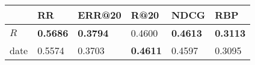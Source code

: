 \begin{tabular}{llllll}
\toprule
{} &               RR &           ERR@20 &             R@20 &             NDCG &              RBP \\
\midrule
$R$  &  \textbf{0.5686} &  \textbf{0.3794} &             0.4600 &  \textbf{0.4613} &  \textbf{0.3113} \\
date &           0.5574 &           0.3703 &  \textbf{0.4611} &           0.4597 &           0.3095 \\
\bottomrule
\end{tabular}
